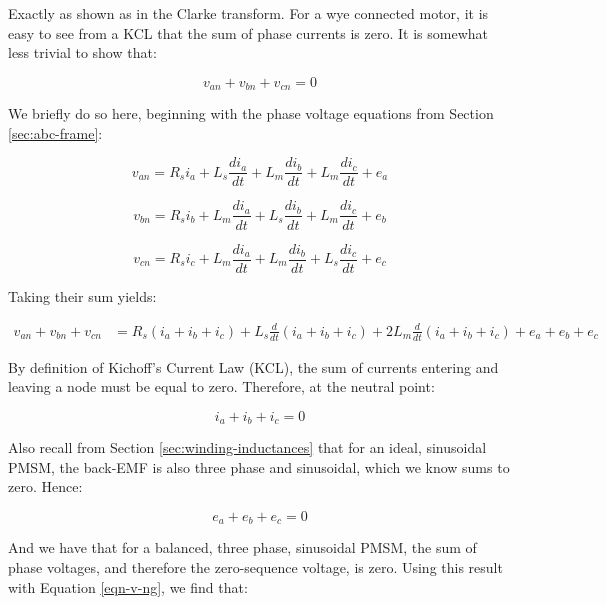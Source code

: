 \documentclass{article}
\begin{document}
Exactly as shown as in the Clarke transform. For a wye connected motor, it is easy to see from a KCL that the sum of phase currents is zero. It is somewhat less trivial to show that:

\begin{equation}
    v_{an} + v_{bn} + v_{cn} = 0
\end{equation}

We briefly do so here, beginning with the phase voltage equations from Section \ref{sec:abc-frame}:

\begin{equation}
    v_{an} = R_si_a + L_s\frac{di_a}{dt} + L_m\frac{di_b}{dt} + L_m\frac{di_c}{dt} + e_a
\end{equation}

\begin{equation}
    v_{bn} = R_si_b + L_m\frac{di_a}{dt} + L_s\frac{di_b}{dt} + L_m\frac{di_c}{dt} + e_b
\end{equation}

\begin{equation}
    v_{cn} = R_si_c + L_m\frac{di_a}{dt} + L_m\frac{di_b}{dt} + L_s\frac{di_c}{dt} + e_c
\end{equation}

Taking their sum yields:

\begin{align}
    v_{an} + v_{bn} + v_{cn} &= R_s(i_a + i_b + i_c) + L_s\frac{d}{dt}(i_a + i_b + i_c) + 2L_m\frac{d}{dt}(i_a + i_b + i_c) + e_a + e_b + e_c
\end{align}

By definition of Kichoff's Current Law (KCL), the sum of currents entering and leaving a node must be equal to zero. Therefore, at the neutral point:

\begin{equation}
    i_a + i_b + i_c = 0
\end{equation}

Also recall from Section \ref{sec:winding-inductances} that for an ideal, sinusoidal PMSM, the back-EMF is also three phase and sinusoidal, which we know sums to zero. Hence:

\begin{equation}
    e_a + e_b + e_c = 0
\end{equation}

And we have that for a balanced, three phase, sinusoidal PMSM, the sum of phase voltages, and therefore the zero-sequence voltage, is zero. Using this result with Equation \ref{eqn-v-ng}, we find that:
\end{document}
